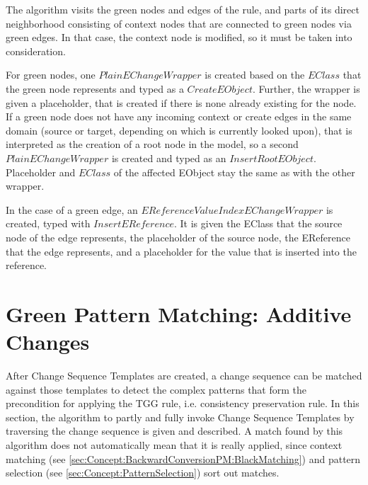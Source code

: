 
The algorithm visits the green nodes and edges of the rule, and parts of its direct neighborhood consisting of context nodes that are connected to green nodes via green edges. In that case, the context node is modified, so it must be taken into consideration.

For green nodes, one $PlainEChangeWrapper$ is created based on the $EClass$ that the green node represents and typed as a $CreateEObject$.
Further, the wrapper is given a placeholder, that is created if there is none already existing for the node.
If a green node does not have any incoming context or create edges in the same domain (source or target, depending on which is currently looked upon), that is interpreted as the creation of a root node in the model, so a second $PlainEChangeWrapper$ is created and typed as an $InsertRootEObject$. Placeholder and $EClass$ of the affected EObject stay the same as with the other wrapper.

In the case of a green edge, an $EReferenceValueIndexEChangeWrapper$ is created, typed with $InsertEReference$. It is given the EClass that the source node of the edge represents, the placeholder of the source node, the EReference that the edge represents, and a placeholder for the value that is inserted into the reference.

\section{Green Pattern Matching: Additive Changes}
\label{sec:Concept:BackwardConversionPM:GreenMatching}
After Change Sequence Templates are created, a change sequence can be matched against those templates to detect the complex patterns that form the precondition for applying the TGG rule, i.e. consistency preservation rule.
In this section, the algorithm to partly and fully invoke Change Sequence Templates by traversing the change sequence is given and described.
A match found by this algorithm does not automatically mean that it is really applied, since context matching (see \autoref{sec:Concept:BackwardConversionPM:BlackMatching}) and pattern selection (see \autoref{sec:Concept:PatternSelection}) sort out matches.

